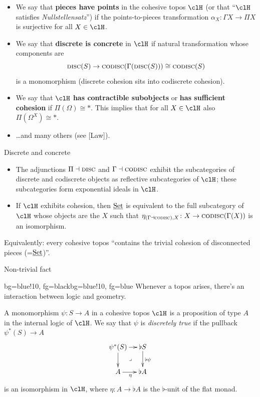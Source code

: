 \documentclass[presentation]{beamer}
\begin{document}
\begin{frame}
  \begin{itemize}
    \item<+-> We say that \textbf{pieces have points} in the cohesive topos $\clH$ (or that ``$\clH$ satisfies \emph{Nullstellensatz}'') if the points-to-pieces transformation $\alpha_X\colon \Gamma X \to \Pi X$ is surjective for all $X\in\clH$.
    \item<+-> We say that \textbf{discrete is concrete} in $\clH$ if natural transformation whose components are
    \[
    \textsc{disc}(S) \to \textsc{codisc}(\Gamma(\textsc{disc}(S))) \cong \textsc{codisc}(S)
    \]
    is a monomorphism (discrete cohesion sits into codiscrete cohesion).
    \item<+-> We say that $\clH$ \textbf{has contractible subobjects} or \textbf{has sufficient cohesion} if $\Pi(\Omega)\cong *$. This implies that for all $X\in\clH$ also $\Pi(\Omega^X)\cong *$.
    
    \vspace*{\fill}
    \item<+-> \dots and many others (see [Law]).
  \end{itemize}
\end{frame}
%
%
%
%
%
%
%
\begin{frame}{Discrete and concrete}
  \begin{prop}
    \begin{itemize}
      \item The adjunctions $\Pi\dashv\textsc{disc}$ and $\Gamma\dashv\textsc{codisc}$ exhibit the subcategories of discrete and codiscrete objects as reflective subcategories of $\clH$; these subcategories form \alert{exponential ideals} in $\clH$.
      \item If $\clH$ exhibits cohesion, then $\underline{\text{Set}}$ is equivalent to the full subcategory of $\clH$ whose objects are the $X$ such that $\eta_{(\Gamma\dashv\textsc{codisc}),X}\colon X\to \textsc{codisc}(\Gamma(X))$ is an isomorphism.
    \end{itemize}
  \end{prop}
  Equivalently: every cohesive topos ``contains the trivial cohesion of disconnected pieces (=$\underline{\text{Set}}$)''.
\end{frame}
%
%
%
%
%
%
%
\begin{frame}{Non-trivial fact}
  \begin{variableblock}{}{bg=blue!10, fg=black}{bg=blue!10, fg=blue}
    Whenever a topos arises, there's an interaction between logic and geometry.
  \end{variableblock}
  \onslide<+->
  \small
  \begin{df}
    A monomorphism $\psi\colon S\to A$ in a cohesive topos $\clH$ is a proposition of type $A$ in the internal logic of $\clH$. We say that $\psi$ is \emph{discretely true} if the pullback $\psi^*(S) \to A$
    \[
    \xymatrix@!=4mm{
    \psi^*(S) \ar[r]\ar[d]\ar@{}[dr]|\lrcorner & \flat S \ar[d]^{\flat\psi} \\
    A \ar[r]_\eta & \flat A
    }
    \]
    is an isomorphism in $\clH$, where $\eta : A\to \flat A$ is the $\flat$-unit of the flat monad.
  \end{df}
\end{frame}
\end{document}
